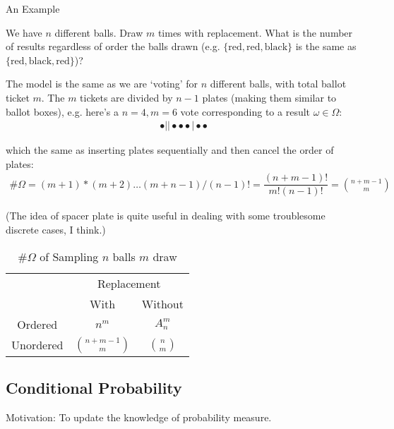 \begin{point}
    An Example 
\end{point}

    We have $ n $ different balls. Draw $ m $ times with replacement. What is the number of results regardless of order the balls drawn (e.g. $ \{\mathrm{red,red,black} \} $ is the same as $ \{\mathrm{red,black,red} \} $)? 

    The model is the same as we are `voting' for $ n $ different balls, with total ballot ticket $ m $. The $ m $ tickets are divided by $ n-1 $ plates (making them similar to ballot boxes), e.g. here's a $ n=4,m=6 $ vote corresponding to a result $ \omega \in\Omega  $:
    \begin{align}
         \bullet  \big|  \big| \bullet \bullet \bullet \big|  \bullet \bullet 
    \end{align}

    which the same as inserting plates sequentially and then cancel the order of plates:
    \begin{align}
        \# \Omega  = (m+1)*(m+2)\ldots (m+n-1)\bigg/ (n-1)! = \dfrac{(n+m-1)!}{m!(n-1)!}=\binom{n+m-1}{m}
    \end{align}

    (The idea of spacer plate is quite useful in dealing with some troublesome discrete cases, I think.)
    
    \begin{table}[H]
        \centering
        \renewcommand\arraystretch{1}
        \caption{$ \# \Omega  $ of Sampling $ n $ balls $ m $ draw}
        \begin{tabular}{ccc}
            \hline
            \hline
            &\multicolumn{2}{c}{Replacement}\\
            \cline{2-3}
            &With&Without\\
            \hline
            Ordered&$ n^m $&$ A_{n}^m $\\
            Unordered&$ \binom{n+m-1}{m} $&$ \binom{n}{m} $\\
            \hline
            \hline
        \end{tabular}
        \label{}
    \end{table}


    
    
    


\subsection{Conditional Probability}
    Motivation: To update the knowledge of probability measure.

